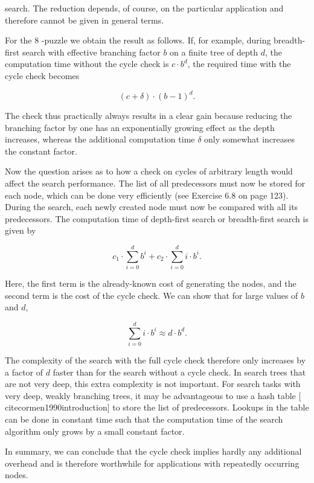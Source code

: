 \documentclass[10pt]{book}
\begin{document}
search. The reduction depends, of course, on the particular application and therefore cannot be given in general terms.


For the 8 -puzzle we obtain the result as follows. If, for example, during breadth-first search with effective branching factor $b$ on a finite tree of depth $d$, the computation time without the cycle check is $c \cdot b^{d}$, the required time with the cycle check becomes

$$
(c+\delta) \cdot(b-1)^{d} .
$$

The check thus practically always results in a clear gain because reducing the branching factor by one has an exponentially growing effect as the depth increases, whereas the additional computation time $\delta$ only somewhat increases the constant factor.

Now the question arises as to how a check on cycles of arbitrary length would affect the search performance. The list of all predecessors must now be stored for each node, which can be done very efficiently (see Exercise 6.8 on page 123). During the search, each newly created node must now be compared with all its predecessors. The computation time of depth-first search or breadth-first search is given by

$$
c_{1} \cdot \sum_{i=0}^{d} b^{i}+c_{2} \cdot \sum_{i=0}^{d} i \cdot b^{i} .
$$

Here, the first term is the already-known cost of generating the nodes, and the second term is the cost of the cycle check. We can show that for large values of $b$ and $d$,

$$
\sum_{i=0}^{d} i \cdot b^{i} \approx d \cdot b^{d} .
$$

The complexity of the search with the full cycle check therefore only increases by a factor of $d$ faster than for the search without a cycle check. In search trees that are not very deep, this extra complexity is not important. For search tasks with very deep, weakly branching trees, it may be advantageous to use a hash table [\\cite{cormen1990introduction}] to store the list of predecessors. Lookups in the table can be done in constant time such that the computation time of the search algorithm only grows by a small constant factor.

In summary, we can conclude that the cycle check implies hardly any additional overhead and is therefore worthwhile for applications with repeatedly occurring nodes.
\end{document}
